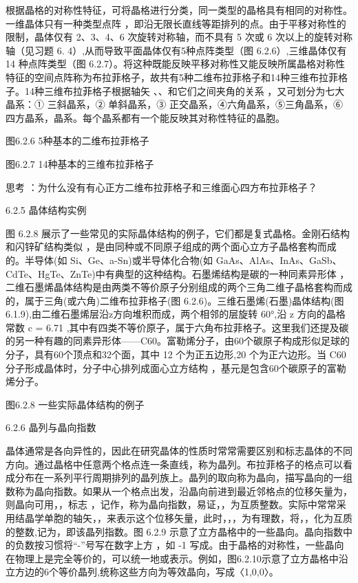 根据晶格的对称性特征，可将晶格进行分类，同一类型的晶格具有相同的对称性。一维晶体只有一种类型点阵 ，即沿无限长直线等距排列的点。由于平移对称性的限制，晶体仅有 2、3、4、6 次旋转对称轴，而不具有 5 次或 6 次以上的旋转对称轴（见习题 6. 4）,从而导致平面晶体仅有5种点阵类型（图 6.2.6）,三维晶体仅有 14 种点阵类型（图 6.2.7）。将这种既能反映平移对称性又能反映所属晶格对称性特征的空间点阵称为布拉菲格子，故共有5种二维布拉菲格子和14种三维布拉菲格子。14种三维布拉菲格子根据轴矢 、、和它们之间夹角的关系 ，又可划分为七大晶系：① 三斜晶系，② 单斜晶系，③ 正交晶系，④六角晶系，⑤三角晶系，⑥ 四方晶系，晶系。每个晶系都有一个能反映其对称性特征的晶胞。



图6.2.6 5种基本的二维布拉菲格子



图6.2.7 14种基本的三维布拉菲格子

思考 ：为什么没有有心正方二维布拉菲格子和三维面心四方布拉菲格子？



6.2.5 晶体结构实例

图 6.2.8 展示了一些常见的实际晶体结构的例子，它们都是复式晶格。金刚石结构和闪锌矿结构类似 ，是由同种或不同原子组成的两个面心立方子晶格套构而成的。半导体(如 Si、Ge、a-Sn)或半导体化合物(如 GaAs、AlAs、InAs、GaSb、CdTe、HgTe、ZnTe)中有典型的这种结构。石墨烯结构是碳的一种同素异形体 ，二维石墨烯晶体结构是由两类不等价原子分别组成的两个三角二维子晶格套构而成的，属于三角(或六角)二维布拉菲格子(图 6.2.6)。三维石墨烯(石墨)晶体结构(图 6.1.9),由二维石墨烯层沿z方向堆积而成，两个相邻的层旋转 60°,沿 z 方向的晶格常数 c = 6.71 ,其中有四类不等价原子，属于六角布拉菲格子。这里我们还提及碳的另一种有趣的同素异形体——C60。富勒烯分子，由60个碳原子构成形似足球的分子，具有60个顶点和32个面，其中 12 个为正五边形,20 个为正六边形。当 C60分子形成晶体时，分子中心排列成面心立方结构 ，基元是包含60个碳原子的富勒烯分子。



图6.2.8 一些实际晶体结构的例子



6.2.6 晶列与晶向指数

晶体通常是各向异性的，因此在研究晶体的性质时常常需要区别和标志晶体的不同方向。通过晶格中任意两个格点连一条直线，称为晶列。布拉菲格子的格点可以看成分布在一系列平行周期排列的晶列族上。晶列的取向称为晶向，描写晶向的一组数称为晶向指数。如果从一个格点出发，沿晶向前进到最近邻格点的位移矢量为，则晶向可用，，标志 ，记作，称为晶向指数，易证，，为互质整数。实际中常常采用结晶学单胞的轴矢，，来表示这个位移矢量，此时，，，为有理数，将，，化为互质的整数,记为，即该晶列指数。图 6.2.9 示意了立方晶格中的一些晶向。晶向指数中的负数按习惯将“-”号写在数字上方 ，如 -1 写成。由于晶格的对称性，一些晶向在物理上是完全等价的，可以统一地或表示。例如，图6.2.10示意了立方晶格中沿立方边的6个等价晶列,统称这些方向为等效晶向，写成〈1,0,0〉。






